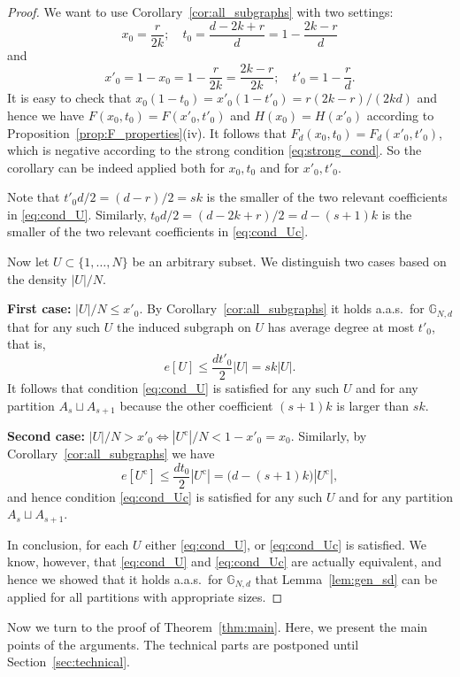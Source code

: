 \documentclass[12pt]{amsart}
\theoremstyle{definition}
\newcommand\Gb{\mathbb{G}}
\newcommand\comp{\mathrm{c}}
\begin{document}
\begin{proof}
We want to use Corollary~\ref{cor:all_subgraphs} with two settings:
%
\[ x_0=\frac{r}{2k}; \quad 
t_0=  \frac{d-2k+r}{d} = 1-\frac{2k-r}{d} \]
%
and
%
\[ x'_0=1-x_0=1-\frac{r}{2k}=\frac{2k-r}{2k}; \quad
t'_0= 1-\frac{r}{d} .\]
%
It is easy to check that $x_0(1-t_0)=x'_0(1-t'_0)=r(2k-r)/(2kd)$ and hence we have $F(x_0,t_0)=F(x'_0,t'_0)$ and $H(x_0)=H(x'_0)$ according to Proposition~\ref{prop:F_properties}(iv). It follows that $F_d(x_0,t_0)=F_d(x'_0,t'_0)$, which is negative according to the strong condition \eqref{eq:strong_cond}. So the corollary can be indeed applied both for $x_0,t_0$ and for $x'_0,t'_0$. 

Note that $t'_0d/2=(d-r)/2=sk$ is the smaller of the two relevant coefficients in \eqref{eq:cond_U}. Similarly, $t_0d/2=(d-2k+r)/2=d-(s+1)k$ is the smaller of the two relevant coefficients in \eqref{eq:cond_Uc}. 

Now let $U \subset \{1,\ldots,N\}$ be an arbitrary subset. We distinguish two cases based on the density $|U|/N$. 

\textbf{First case: } $|U|/N \leq x'_0$. By Corollary~\ref{cor:all_subgraphs} it holds a.a.s.~for $\Gb_{N,d}$ that for any such $U$ the induced subgraph on $U$ has average degree at most $t'_0$, that is, 
%
\[ e[U] \leq \frac{dt'_0}{2} |U|  = sk |U|.\]
%
It follows that condition \eqref{eq:cond_U} is satisfied for any such $U$ and for any partition $A_s \sqcup A_{s+1}$ because the other coefficient $(s+1)k$ is larger than $sk$.

\textbf{Second case: } $|U|/N > x'_0 \Leftrightarrow |U^\comp|/N< 1-x'_0=x_0$. Similarly, by Corollary~\ref{cor:all_subgraphs} we have  
%
\[ e[U^\comp] \leq \frac{dt_0}{2} |U^\comp| 
= \big( d- (s+1)k \big) |U^\comp| ,\]
and hence condition \eqref{eq:cond_Uc} is satisfied for any such $U$ and for any partition $A_s \sqcup A_{s+1}$.

In conclusion, for each $U$ either \eqref{eq:cond_U}, or \eqref{eq:cond_Uc} is satisfied. We know, however, that \eqref{eq:cond_U} and \eqref{eq:cond_Uc} are actually equivalent, and hence we showed that it holds a.a.s.~for $\Gb_{N,d}$ that Lemma~\ref{lem:gen_sd} can be applied for all partitions with appropriate sizes.
\end{proof}
%

Now we turn to the proof of Theorem~\ref{thm:main}. Here, we present the main points of the arguments. The technical parts are postponed until Section~\ref{sec:technical}. 
\end{document}

